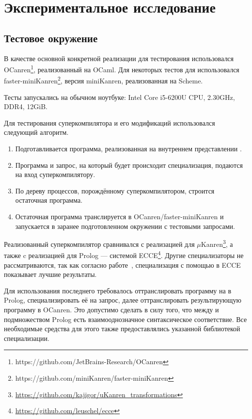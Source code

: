 \section{Экспериментальное исследование}
\label{sec:testing}

\subsection{Тестовое окружение}

В качестве основной конкретной реализации \ukanren для тестирования
использовался OCanren\footnote{https://github.com/JetBrains-Research/OCanren}\cite{ocanren},
реализованный на OCaml\cite{ocanren}.
Для некоторых тестов для использовался faster-miniKanren\footnote{https://github.com/miniKanren/faster-miniKanren},
версия miniKanren, реализованная на Scheme.

Тесты запускались на обычном ноутбуке: Intel Core i5-6200U CPU, 2.30GHz, DDR4, 12GiB.

Для тестирования суперкомпилятора и его модификаций использовался следующий алгоритм.
\begin{enumerate}
\item Подготавливается программа, реализованная на внутреннем представлении \ukanren.
\item Программа и запрос, на который будет происходит специализация, подаются на вход суперкомпилятору.
\item По дереву процессов, порождённому суперкомпилятором, строится остаточная программа.
\item Остаточная программа транслируется в OCanren/faster-miniKanren и
      запускается в заранее подготовленном окружении с тестовыми запросами.
\end{enumerate}


Реализованный суперкомпилятор сравнивался с реализацией \forcpd для $\mu$Kanren\footnote{\url{https://github.com/kajigor/uKanren_transformations}},
а также c реализацией \forcpd для Prolog --- системой ECCE\footnote{\url{https://github.com/leuschel/ecce}}.
Другие специализаторы не рассматриваются, так как согласно работе~\cite{controlPoly}, специализация с
помощью \forcpd в ECCE показывает лучшие результаты.

Для использования последнего требовалось оттранслировать программу на \ukanren в Prolog, специализировать
её на запрос, далее оттранслировать результирующую программу в OCanren.
Это допустимо сделать в силу того, что между \ukanren и подмножеством Prolog есть
взаимооднозначное синтаксическое соответствие. 
Все необходимые средства для этого также предоставлялись указанной библиотекой специализации.


